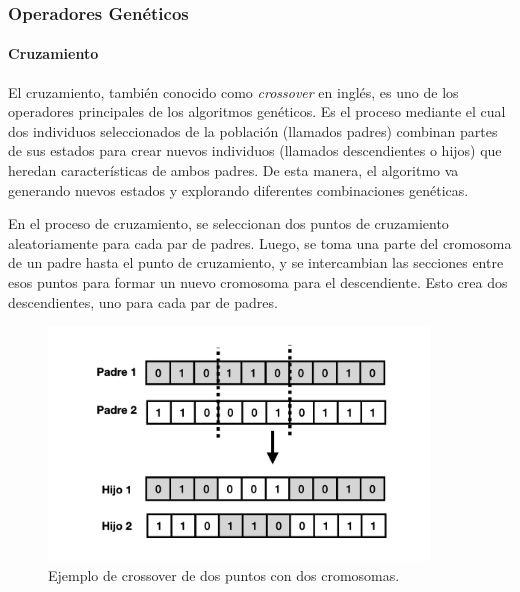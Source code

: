\subsubsection{Operadores Genéticos}


\paragraph{Cruzamiento} 


El cruzamiento, también conocido como \emph{crossover} en inglés, es uno de los operadores principales de los algoritmos genéticos. Es el proceso mediante el cual dos individuos seleccionados de la población (llamados padres) combinan partes de sus estados para crear nuevos individuos (llamados descendientes o hijos) que heredan características de ambos padres. De esta manera, el algoritmo va generando nuevos estados y explorando diferentes combinaciones genéticas.

En el proceso de cruzamiento, se seleccionan dos puntos de cruzamiento aleatoriamente para cada par de padres. Luego, se toma una parte del cromosoma de un padre hasta el punto de cruzamiento, y se intercambian las secciones entre esos puntos para formar un nuevo cromosoma para el descendiente. Esto crea dos descendientes, uno para cada par de padres.


\begin{figure}
  \centering
  \includegraphics[width=0.9\textwidth]{images/crossOver.png}
  \caption{Ejemplo de crossover de dos puntos con dos cromosomas.}
  \label{fig:crossover}
\end{figure}


